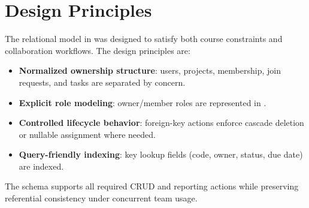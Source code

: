 \section{Design Principles}

The relational model in  was designed to satisfy both course constraints and collaboration workflows.
The design principles are:
\begin{itemize}
    \item \textbf{Normalized ownership structure}: users, projects, membership, join requests, and tasks are separated by concern.
    \item \textbf{Explicit role modeling}: owner/member roles are represented in .
    \item \textbf{Controlled lifecycle behavior}: foreign-key actions enforce cascade deletion or nullable assignment where needed.
    \item \textbf{Query-friendly indexing}: key lookup fields (code, owner, status, due date) are indexed.
\end{itemize}

The schema supports all required CRUD and reporting actions while preserving referential consistency under concurrent team usage.
